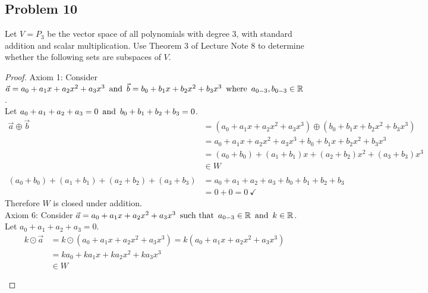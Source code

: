 \subsection*{Problem 10}
Let $V = P_3$ be the vector space of all polynomials with degree  3, with standard addition and scalar multiplication. Use Theorem 3 of Lecture Note 8 to determine whether the following sets are subspaces of $V$.
\begin{enumerate}
  \begin{proof}
    Axiom 1: Consider $\vec{a} = a_0+a_1x+a_2x^2+a_3x^3 \operatorname{~\text{and}~} \vec{b} = b_0+b_1x+b_2x^2+b_3x^3 \operatorname{~\text{where}~} a_{0-3}, b_{0-3} \in \mathbb{R}$. \\
    Let $a_0+a_1+a_2+a_3=0 \operatorname{~\text{and}~} b_0+b_1+b_2+b_3=0$.
    \begin{align*}
      \vec{a} \oplus \vec{b}                        & = (a_0+a_1x+a_2x^2+a_3x^3) \oplus (b_0+b_1x+b_2x^2+b_3x^3) \\
                                                    & = a_0+a_1x+a_2x^2+a_3x^3 + b_0+b_1x+b_2x^2+b_3x^3          \\
                                                    & = (a_0+b_0) + (a_1+b_1)x + (a_2+b_2)x^2 + (a_3+b_3)x^3     \\
                                                    & \in W                                                      \\ \\
      (a_0+b_0) + (a_1+b_1) + (a_2+b_2) + (a_3+b_3) & = a_0 + a_1 + a_2 + a_3 + b_0 + b_1 + b_2 + b_3            \\
                                                    & = 0 + 0 = 0~\checkmark
    \end{align*}
    Therefore $W$ is closed under addition. \\
    Axiom 6: Consider $\vec{a} = a_0+a_1x+a_2x^2+a_3x^3 \operatorname{~\text{such that}~} a_{0-3} \in \mathbb{R} \operatorname{~\text{and}~} k \in \mathbb{R}$. \\
    Let $a_0+a_1+a_2+a_3=0$.
    \begin{align*}
      k \odot \vec{a} & = k \odot (a_0+a_1x+a_2x^2+a_3x^3) = k(a_0+a_1x+a_2x^2+a_3x^3)           \\
                      & = ka_0+ka_1x+ka_2x^2+ka_3x^3                                             \\
                      & \in W                                                                    \\ \\

\end{align*}
\end{proof}
\end{enumerate}
